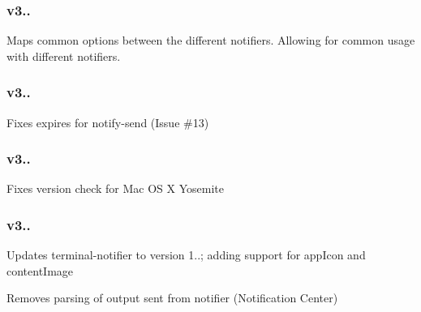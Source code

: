 \subsubsection*{{\ttfamily v3..}}


\begin{DoxyEnumerate}
\item Maps common options between the different notifiers. Allowing for common usage with different notifiers.
\end{DoxyEnumerate}

\subsubsection*{{\ttfamily v3..}}


\begin{DoxyEnumerate}
\item Fixes expires for notify-\/send (Issue \#13)
\end{DoxyEnumerate}

\subsubsection*{{\ttfamily v3..}}


\begin{DoxyEnumerate}
\item Fixes version check for Mac OS X Yosemite
\end{DoxyEnumerate}

\subsubsection*{{\ttfamily v3..}}


\begin{DoxyEnumerate}
\item Updates terminal-\/notifier to version 1..; adding support for app\+Icon and content\+Image
\item Removes parsing of output sent from notifier (Notification Center) 
\end{DoxyEnumerate}